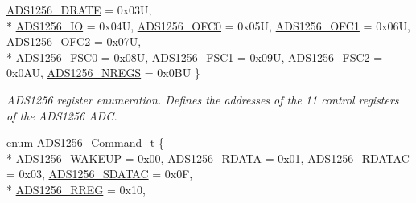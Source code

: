 \begin{DoxyCompactItemize}
\hyperlink{group__ads1256__driver_gga03b6f97db2c7988af4c239575cc88fdeacec171aa33aaa60cc213196342d75488}{A\-D\-S1256\-\_\-\-D\-R\-A\-T\-E} = 0x03\-U, 
\\*
\hyperlink{group__ads1256__driver_gga03b6f97db2c7988af4c239575cc88fdeae03cf2e683ca72e093cbc79352b4d7ed}{A\-D\-S1256\-\_\-\-I\-O} = 0x04\-U, 
\hyperlink{group__ads1256__driver_gga03b6f97db2c7988af4c239575cc88fdeaeb4092ff7d4d1de90200d3555a6e2c6c}{A\-D\-S1256\-\_\-\-O\-F\-C0} = 0x05\-U, 
\hyperlink{group__ads1256__driver_gga03b6f97db2c7988af4c239575cc88fdeaf21f5bd93a2140b83adfc26c55d5a9f5}{A\-D\-S1256\-\_\-\-O\-F\-C1} = 0x06\-U, 
\hyperlink{group__ads1256__driver_gga03b6f97db2c7988af4c239575cc88fdeaf07570553a6f796ef337e5075dc30767}{A\-D\-S1256\-\_\-\-O\-F\-C2} = 0x07\-U, 
\\*
\hyperlink{group__ads1256__driver_gga03b6f97db2c7988af4c239575cc88fdeaa0f2a3e21e4efa92857623a7283cfdd1}{A\-D\-S1256\-\_\-\-F\-S\-C0} = 0x08\-U, 
\hyperlink{group__ads1256__driver_gga03b6f97db2c7988af4c239575cc88fdeaf24fb3090a15c8ec37e8920054076b33}{A\-D\-S1256\-\_\-\-F\-S\-C1} = 0x09\-U, 
\hyperlink{group__ads1256__driver_gga03b6f97db2c7988af4c239575cc88fdea546b556453240d6fcf14f818575e4e00}{A\-D\-S1256\-\_\-\-F\-S\-C2} = 0x0\-A\-U, 
\hyperlink{group__ads1256__driver_gga03b6f97db2c7988af4c239575cc88fdea6f3879237c79faf51383e8a52dbecd58}{A\-D\-S1256\-\_\-\-N\-R\-E\-G\-S} = 0x0\-B\-U
 \}
\begin{DoxyCompactList}\small\item\em A\-D\-S1256 register enumeration. Defines the addresses of the 11 control registers of the A\-D\-S1256 A\-D\-C. \end{DoxyCompactList}\item 
enum \hyperlink{group__ads1256__driver_gadb203fb3b246881a33160b5b25822d42}{A\-D\-S1256\-\_\-\-Command\-\_\-t} \{ \\*
\hyperlink{group__ads1256__driver_ggadb203fb3b246881a33160b5b25822d42a7ec76391f15bfc4dbc9f67f657793a8a}{A\-D\-S1256\-\_\-\-W\-A\-K\-E\-U\-P} = 0x00, 
\hyperlink{group__ads1256__driver_ggadb203fb3b246881a33160b5b25822d42a4fba878e65192a50066360cc328630c6}{A\-D\-S1256\-\_\-\-R\-D\-A\-T\-A} = 0x01, 
\hyperlink{group__ads1256__driver_ggadb203fb3b246881a33160b5b25822d42a679e4ecf298787f45a358ac2a1134e4f}{A\-D\-S1256\-\_\-\-R\-D\-A\-T\-A\-C} = 0x03, 
\hyperlink{group__ads1256__driver_ggadb203fb3b246881a33160b5b25822d42a4cd4f08ab7243e4dc7b3c1f1bafbc4ff}{A\-D\-S1256\-\_\-\-S\-D\-A\-T\-A\-C} = 0x0\-F, 
\\*
\hyperlink{group__ads1256__driver_ggadb203fb3b246881a33160b5b25822d42aee3ef8f7acb16ce684bfd531f1c79ab6}{A\-D\-S1256\-\_\-\-R\-R\-E\-G} = 0x10, 

\end{DoxyCompactItemize}
